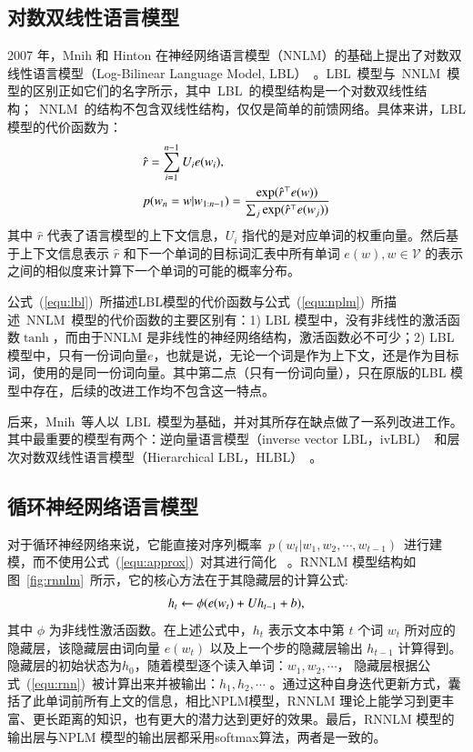 \subsection{对数双线性语言模型}
2007 年，Mnih 和 Hinton 在神经网络语言模型（NNLM）的基础上提出了对数双线性语言模型（Log-Bilinear Language Model, LBL）~。LBL~模型与~NNLM~模型的区别正如它们的名字所示，其中~LBL~的模型结构是一个对数双线性结构；~NNLM~的结构不包含双线性结构，仅仅是简单的前馈网络。具体来讲，LBL 模型的代价函数为：
\begin{equation}
\setlength{\abovedisplayskip}{6pt}
\setlength{\belowdisplayskip}{6pt}
\label{equ:lbl}
\begin{split}
   &\hat r=\sum_{i=1}^{n-1}{U_i e({w_i})}, \\
   &p(w_n=w|w_{1:n-1})=\frac{\exp(\hat r^\top e(w))}{\sum_j{\exp(\hat r^\top e(w_j))}}
\end{split}
\end{equation}
其中 $\hat r$ 代表了语言模型的上下文信息，$U_i$ 指代的是对应单词的权重向量。然后基于上下文信息表示 $\hat r$ 和下一个单词的目标词汇表中所有单词 $e(w),w\in \mathcal{V}$ 的表示之间的相似度来计算下一个单词的可能的概率分布。

公式~(\ref{equ:lbl})~所描述LBL模型的代价函数与公式~(\ref{equ:nplm})~所描述~NNLM~模型的代价函数的主要区别有：1) LBL 模型中，没有非线性的激活函数$\tanh$，而由于NNLM 是非线性的神经网络结构，激活函数必不可少；2) LBL 模型中，只有一份词向量$e$，也就是说，无论一个词是作为上下文，还是作为目标词，使用的是同一份词向量。其中第二点（只有一份词向量），只在原版的LBL 模型中存在，后续的改进工作均不包含这一特点。

后来，Mnih~等人以~LBL~模型为基础，并对其所存在缺点做了一系列改进工作。其中最重要的模型有两个：逆向量语言模型（inverse vector LBL，ivLBL）~和层次对数双线性语言模型（Hierarchical LBL，HLBL）~。

\subsection{循环神经网络语言模型}
对于循环神经网络来说，它能直接对序列概率~$p(w_t | w_1,w_2,\cdots,w_{t-1})$~进行建模，而不使用公式~(\ref{equ:approx})~对其进行简化~ 。RNNLM 模型结构如图~\ref{fig:rnnlm}~所示，它的核心方法在于其隐藏层的计算公式:
\begin{equation}
\setlength{\abovedisplayskip}{6pt}
\setlength{\belowdisplayskip}{6pt}
\label{equ:rnn}
  h_t \leftarrow  \phi(e(w_t) + U h_{t-1} +b),
\end{equation}
其中 $\phi$ 为非线性激活函数。在上述公式中，$h_t$ 表示文本中第 $t$ 个词 $w_t$ 所对应的隐藏层，该隐藏层由词向量 $e(w_t)$ 以及上一个步的隐藏层输出 $h_{t -1}$ 计算得到。隐藏层的初始状态为$h_0$，随着模型逐个读入单词：$w_1,w_2,\cdots$， 隐藏层根据公式~(\ref{equ:rnn})~被计算出来并被输出：$h_1,h_2,\cdots$ 。通过这种自身迭代更新方式，囊括了此单词前所有上文的信息，相比NPLM模型，RNNLM 理论上能学习到更丰富、更长距离的知识，也有更大的潜力达到更好的效果。最后，RNNLM 模型的输出层与NPLM 模型的输出层都采用softmax算法，两者是一致的。

